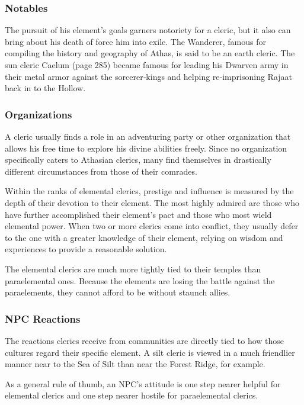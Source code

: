\subsubsection{Notables}

The pursuit of his element's goals garners notoriety for a cleric, but it also can bring about his death of force him into exile. The Wanderer, famous for compiling the history and geography of Athas, is said to be an earth cleric. The sun cleric Caelum (page 285) became famous for leading his Dwarven army in their metal armor against the sorcerer‐kings and helping re‐imprisoning Rajaat back in to the Hollow.

\subsubsection{Organizations}

A cleric usually finds a role in an adventuring party or other organization that allows his free time to explore his divine abilities freely. Since no organization specifically caters to Athasian clerics, many find themselves in drastically different circumstances from those of their comrades.

Within the ranks of elemental clerics, prestige and influence is measured by the depth of their devotion to their element. The most highly admired are those who have further accomplished their element's pact and those who most wield elemental power. When two or more clerics come into conflict, they usually defer to the one with a greater knowledge of their element, relying on wisdom and experiences to provide a reasonable solution.

The elemental clerics are much more tightly tied to their temples than paraelemental ones. Because the elements are losing the battle against the paraelements, they cannot afford to be without staunch allies.

\subsubsection{NPC Reactions}

The reactions clerics receive from communities are directly tied to how those cultures regard their specific element. A silt cleric is viewed in a much friendlier manner near to the Sea of Silt than near the Forest Ridge, for example.

As a general rule of thumb, an NPC's attitude is one step nearer helpful for elemental clerics and one step nearer hostile for paraelemental clerics.

